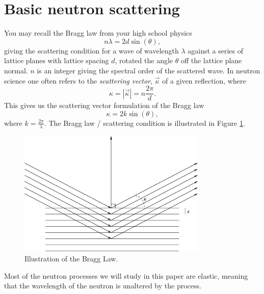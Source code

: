 \section{Basic neutron scattering}
You may recall the Bragg law from your high school physics
\[n\lambda=2d\sin(\theta),\]
giving the scattering condition for 
a wave of wavelength $\lambda$ against a series of
lattice planes with lattice spacing $d$, rotated the angle $\theta$
off the lattice plane normal. $n$ is an integer giving the spectral
order of the scattered wave. In neutron science one often refers to
the \emph{scattering vector}, $\vec{\kappa}$ of a given reflection, where
\[\kappa=|\vec{\kappa}|=n\frac{2\pi}{d}.\]
This gives us the scattering vector formulation of the Bragg law
\[\kappa=2k\sin(\theta),\]
where $k=\frac{2\pi}{\lambda}$.
The Bragg law / scattering condition is illustrated in Figure \ref{bragg.eps}.
\begin{figure}[htb!]
\begin{center}
\includegraphics[width=9cm]{pics/bragg.eps}
\end{center}
\caption{Illustration of the Bragg Law.}
\label{bragg.eps}
\end{figure}
Most of the neutron processes we will study in this paper are elastic,
meaning that the wavelength of the neutron is unaltered by the process.
